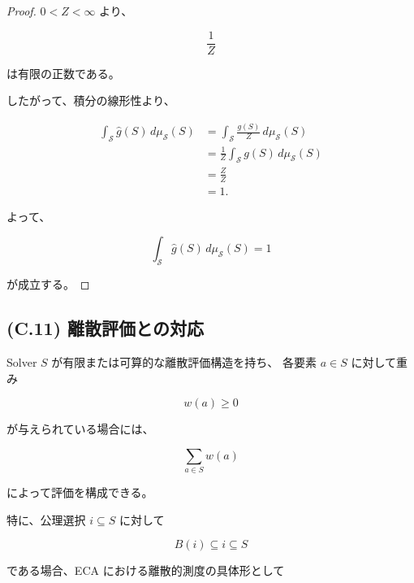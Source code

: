 \documentclass[a4paper,11pt]{article}
\newcommand{\Solver}{\mathcal{S}}
\begin{document}
\begin{proof}

$0<Z<\infty$ より、

\begin{equation}
    \frac{1}{Z}
\end{equation}

は有限の正数である。

したがって、積分の線形性より、

\begin{align}
    \int_{\Solver}
    \widehat g(S)\,d\mu_{\Solver}(S)
    &=
    \int_{\Solver}
    \frac{g(S)}{Z}
    \,d\mu_{\Solver}(S)
    \\
    &=
    \frac{1}{Z}
    \int_{\Solver}
    g(S)\,d\mu_{\Solver}(S)
    \\
    &=
    \frac{Z}{Z}
    \\
    &=1.
\end{align}

よって、

\begin{equation}
    \int_{\Solver}
    \widehat g(S)\,d\mu_{\Solver}(S)
    =
    1
\end{equation}

が成立する。
\end{proof}


\subsection{(C.11) 離散評価との対応}
\label{subsec:C11}

Solver $S$ が有限または可算的な離散評価構造を持ち、
各要素 $a\in S$ に対して重み

\begin{equation}
    w(a)\geq0
\end{equation}

が与えられている場合には、

\begin{equation}
    \sum_{a\in S}w(a)
\end{equation}

によって評価を構成できる。

特に、公理選択 $i\subseteq S$ に対して

\begin{equation}
    B(i)\subseteq i\subseteq S
\end{equation}

である場合、ECA における離散的測度の具体形として
\end{document}
